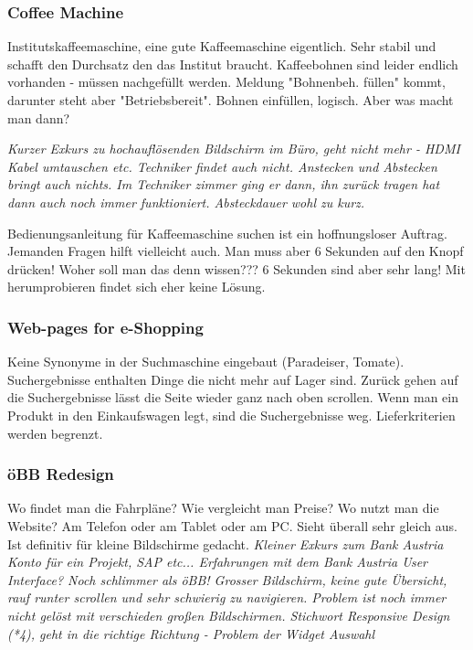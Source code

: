 
\subsubsection{Coffee Machine}
Institutskaffeemaschine, eine gute Kaffeemaschine eigentlich. 
Sehr stabil und schafft den Durchsatz den das Institut braucht.
Kaffeebohnen sind leider endlich vorhanden - müssen nachgefüllt werden.
Meldung "Bohnenbeh. füllen" kommt, darunter steht aber "Betriebsbereit".
Bohnen einfüllen, logisch. Aber was macht man dann?

\textit{Kurzer Exkurs zu hochauflösenden Bildschirm im Büro, geht nicht mehr - HDMI Kabel umtauschen etc. Techniker findet auch nicht. 
Anstecken und Abstecken bringt auch nichts. 
Im Techniker zimmer ging er dann, ihn zurück tragen hat dann auch noch immer funktioniert. 
Absteckdauer wohl zu kurz.}

Bedienungsanleitung für Kaffeemaschine suchen ist ein hoffnungsloser Auftrag.
Jemanden Fragen hilft vielleicht auch. Man muss aber 6 Sekunden auf den Knopf drücken!
Woher soll man das denn wissen??? 6 Sekunden sind aber sehr lang! Mit herumprobieren
findet sich eher keine Lösung. 

\subsubsection{Web-pages for e-Shopping}
Keine Synonyme in der Suchmaschine eingebaut (Paradeiser, Tomate).
Suchergebnisse enthalten Dinge die nicht mehr auf Lager sind.
Zurück gehen auf die Suchergebnisse lässt die Seite wieder ganz nach oben scrollen.
Wenn man ein Produkt in den Einkaufswagen legt, sind die Suchergebnisse weg.
Lieferkriterien werden begrenzt.

\subsubsection{öBB Redesign}
Wo findet man die Fahrpläne?
Wie vergleicht man Preise?
Wo nutzt man die Website? Am Telefon oder am Tablet oder am PC. Sieht überall
sehr gleich aus. Ist definitiv für kleine Bildschirme gedacht. 
\textit{Kleiner Exkurs zum Bank Austria Konto für ein Projekt, SAP etc... Erfahrungen mit dem Bank Austria User Interface? Noch schlimmer als öBB! Grosser Bildschirm, keine gute Übersicht, rauf runter scrollen und sehr schwierig zu navigieren. 
Problem ist noch immer nicht gelöst mit verschieden großen Bildschirmen. Stichwort Responsive Design (*4), geht in die richtige Richtung - Problem der Widget Auswahl}

